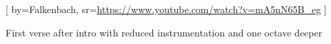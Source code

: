 [
  by={Falkenbach},
  sr={\url{https://www.youtube.com/watch?v=mA5nN65B\_eg}}
]
\meter{}{} %

\begin{lilypondf}
\end{lilypondf}

\beginverse\memorize[eweroun_a]
\begin{performanceinstruction}
  First verse after intro with reduced instrumentation and one octave deeper
\end{performanceinstruction}
